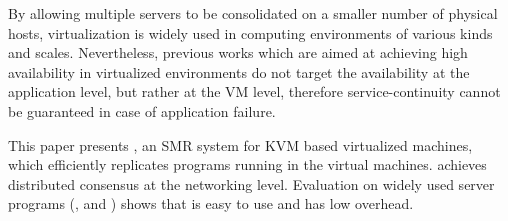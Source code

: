 By allowing multiple servers to be consolidated on a smaller number of physical 
hosts, virtualization is widely used in computing environments of various kinds and
scales. Nevertheless, previous works which are aimed at achieving high availability 
in virtualized environments do not target the availability at the application level, 
but rather at the VM level, therefore service-continuity cannot be guaranteed in case 
of application failure.

This paper presents \xxx, an SMR system for KVM based virtualized machines, 
which efficiently replicates programs running in the virtual machines. 
\xxx achieves distributed consensus at the networking level. 
Evaluation on \nprog widely used server programs (\eg, \mysql and \redis) shows 
that \xxx is easy to use and has low overhead.
